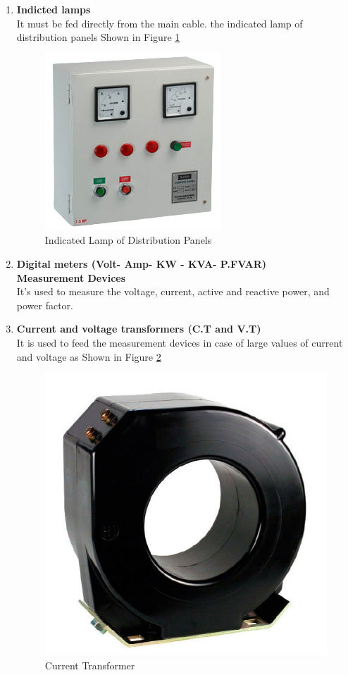 \documentclass[12pt,fleqn]{book} %
\begin{document}
\begin{enumerate}
\item \textbf {Indicted lamps} \\
It must be fed directly from the main cable.
the indicated lamp of distribution panels Shown in Figure \ref{fig:fergany 4}
\begin{figure}[h!]
    \centering
    \includegraphics[width=0.5\linewidth]{fergany 4.png}
    \caption{Indicated Lamp of Distribution Panels}
    \label{fig:fergany 4}
\end{figure}

\item \textbf {Digital meters (Volt- Amp- KW - KVA- P.FVAR)}
\\ \textbf {Measurement Devices}
\\ It's used to measure the voltage, current, active and reactive power, and power factor.
\item \textbf {Current and voltage transformers (C.T and V.T)}
\\ It is used to feed the measurement devices in case of large values of current and voltage as Shown in Figure \ref{fig:fergany 5}
\begin{figure}[h!]
    \centering
    \includegraphics[width=0.5\linewidth]{fergany 5.png}
    \caption{Current Transformer}
    \label{fig:fergany 5}
\end{figure}
\end{enumerate}
\end{document}

